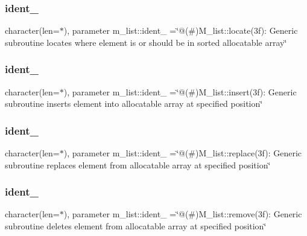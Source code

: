 \mbox{\label{namespacem__list_a5b8d48a0fc3218e8ed1d263a73748a27}} 
\subsubsection{\texorpdfstring{ident\+\_}{ident\_1}}
{\footnotesize\ttfamily character(len=$\ast$), parameter m\+\_\+list\+::ident\+\_ =\char`\"{}@(\#)M\+\_\+list\+::locate(3f)\+: Generic subroutine locates where element is or should be in sorted allocatable array\char`\"{}\hspace{0.3cm}{\ttfamily [private]}}

\mbox{\label{namespacem__list_a25c880ddb1248291f9b143e99fd80870}} 
\subsubsection{\texorpdfstring{ident\+\_}{ident\_2}}
{\footnotesize\ttfamily character(len=$\ast$), parameter m\+\_\+list\+::ident\+\_ =\char`\"{}@(\#)M\+\_\+list\+::insert(3f)\+: Generic subroutine inserts element into allocatable array at specified position\char`\"{}\hspace{0.3cm}{\ttfamily [private]}}

\mbox{\label{namespacem__list_a47ce2be826f94ee09c3b15b367504866}} 
\subsubsection{\texorpdfstring{ident\+\_}{ident\_3}}
{\footnotesize\ttfamily character(len=$\ast$), parameter m\+\_\+list\+::ident\+\_ =\char`\"{}@(\#)M\+\_\+list\+::replace(3f)\+: Generic subroutine replaces element from allocatable array at specified position\char`\"{}\hspace{0.3cm}{\ttfamily [private]}}

\mbox{\label{namespacem__list_a9ff7bfbdf866c8a3a9fc831c228ce065}} 
\subsubsection{\texorpdfstring{ident\+\_}{ident\_4}}
{\footnotesize\ttfamily character(len=$\ast$), parameter m\+\_\+list\+::ident\+\_ =\char`\"{}@(\#)M\+\_\+list\+::remove(3f)\+: Generic subroutine deletes element from allocatable array at specified position\char`\"{}\hspace{0.3cm}{\ttfamily [private]}}

